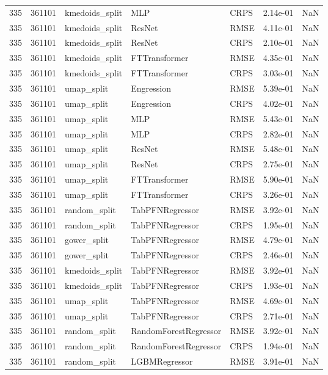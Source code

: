 \begin{tabular}{rrlllrr}
335 & 361101 & kmedoids\_split & MLP & CRPS & 2.14e-01 & NaN \\
335 & 361101 & kmedoids\_split & ResNet & RMSE & 4.11e-01 & NaN \\
335 & 361101 & kmedoids\_split & ResNet & CRPS & 2.10e-01 & NaN \\
335 & 361101 & kmedoids\_split & FTTransformer & RMSE & 4.35e-01 & NaN \\
335 & 361101 & kmedoids\_split & FTTransformer & CRPS & 3.03e-01 & NaN \\
335 & 361101 & umap\_split & Engression & RMSE & 5.39e-01 & NaN \\
335 & 361101 & umap\_split & Engression & CRPS & 4.02e-01 & NaN \\
335 & 361101 & umap\_split & MLP & RMSE & 5.43e-01 & NaN \\
335 & 361101 & umap\_split & MLP & CRPS & 2.82e-01 & NaN \\
335 & 361101 & umap\_split & ResNet & RMSE & 5.48e-01 & NaN \\
335 & 361101 & umap\_split & ResNet & CRPS & 2.75e-01 & NaN \\
335 & 361101 & umap\_split & FTTransformer & RMSE & 5.90e-01 & NaN \\
335 & 361101 & umap\_split & FTTransformer & CRPS & 3.26e-01 & NaN \\
335 & 361101 & random\_split & TabPFNRegressor & RMSE & 3.92e-01 & NaN \\
335 & 361101 & random\_split & TabPFNRegressor & CRPS & 1.95e-01 & NaN \\
335 & 361101 & gower\_split & TabPFNRegressor & RMSE & 4.79e-01 & NaN \\
335 & 361101 & gower\_split & TabPFNRegressor & CRPS & 2.46e-01 & NaN \\
335 & 361101 & kmedoids\_split & TabPFNRegressor & RMSE & 3.92e-01 & NaN \\
335 & 361101 & kmedoids\_split & TabPFNRegressor & CRPS & 1.93e-01 & NaN \\
335 & 361101 & umap\_split & TabPFNRegressor & RMSE & 4.69e-01 & NaN \\
335 & 361101 & umap\_split & TabPFNRegressor & CRPS & 2.71e-01 & NaN \\
335 & 361101 & random\_split & RandomForestRegressor & RMSE & 3.92e-01 & NaN \\
335 & 361101 & random\_split & RandomForestRegressor & CRPS & 1.94e-01 & NaN \\
335 & 361101 & random\_split & LGBMRegressor & RMSE & 3.91e-01 & NaN \\

\end{tabular}

